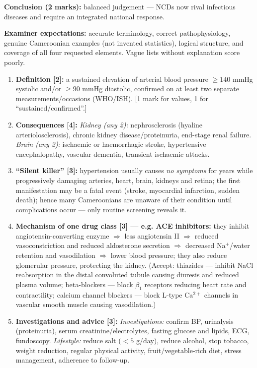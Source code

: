 \documentclass[11pt]{article}
\begin{document}
\begin{corrige}
\textbf{Conclusion (2 marks):} balanced judgement — NCDs now rival infectious diseases and require an integrated national response.

\textbf{Examiner expectations:} accurate terminology, correct pathophysiology, genuine Cameroonian examples (not invented statistics), logical structure, and coverage of all four requested elements. Vague lists without explanation score poorly.
\end{corrige}

\begin{corrige}
\begin{enumerate}
\item \textbf{Definition [2]:} a sustained elevation of arterial blood pressure $\ge 140$ mmHg systolic and/or $\ge 90$ mmHg diastolic, confirmed on at least two separate measurements/occasions (WHO/ISH). [1 mark for values, 1 for ``sustained/confirmed''.]
\item \textbf{Consequences [4]:} \emph{Kidney (any 2):} nephrosclerosis (hyaline arteriolosclerosis), chronic kidney disease/proteinuria, end-stage renal failure. \emph{Brain (any 2):} ischaemic or haemorrhagic stroke, hypertensive encephalopathy, vascular dementia, transient ischaemic attacks.
\item \textbf{``Silent killer'' [3]:} hypertension usually causes \emph{no symptoms} for years while progressively damaging arteries, heart, brain, kidneys and retina; the first manifestation may be a fatal event (stroke, myocardial infarction, sudden death); hence many Cameroonians are unaware of their condition until complications occur — only routine screening reveals it.
\item \textbf{Mechanism of one drug class [3] — e.g. ACE inhibitors:} they inhibit angiotensin-converting enzyme $\Rightarrow$ less angiotensin II $\Rightarrow$ reduced vasoconstriction and reduced aldosterone secretion $\Rightarrow$ decreased Na$^+$/water retention and vasodilation $\Rightarrow$ lower blood pressure; they also reduce glomerular pressure, protecting the kidney. (Accept: thiazides — inhibit NaCl reabsorption in the distal convoluted tubule causing diuresis and reduced plasma volume; beta-blockers — block $\beta_1$ receptors reducing heart rate and contractility; calcium channel blockers — block L-type Ca$^{2+}$ channels in vascular smooth muscle causing vasodilation.)
\item \textbf{Investigations and advice [3]:} \emph{Investigations:} confirm BP, urinalysis (proteinuria), serum creatinine/electrolytes, fasting glucose and lipids, ECG, fundoscopy. \emph{Lifestyle:} reduce salt ($<5$ g/day), reduce alcohol, stop tobacco, weight reduction, regular physical activity, fruit/vegetable-rich diet, stress management, adherence to follow-up.
\end{enumerate}
\end{corrige}
\end{document}
